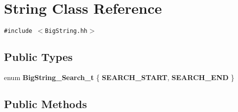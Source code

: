 \section{String  Class Reference}
\label{classString}
{\tt \#include $<$Big\-String.hh$>$}

\subsection*{Public Types}
\begin{CompactItemize}
\item 
enum {\bf Big\-String\_\-Search\_\-t} \{ {\bf SEARCH\_\-START}, 
{\bf SEARCH\_\-END}
 \}
\end{CompactItemize}
\subsection*{Public Methods}
